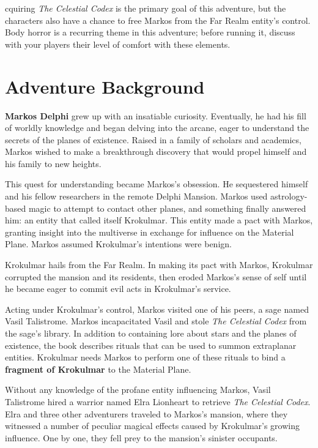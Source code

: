 \documentclass[10pt,a4paper,twoside,bg=print,twocolumn,openany,nodeprecatedcode]{dndbook}
\begin{document}
cquiring \textit{The Celestial Codex} is the primary goal of this adventure, but the characters also have a chance to free Markos from the Far Realm entity's control. Body horror is a recurring theme in this adventure; before running it, discuss with your players their level of comfort with these elements.


\section{Adventure Background}
\textbf{Markos Delphi} grew up with an insatiable curiosity. Eventually, he had his fill of worldly knowledge and began delving into the arcane, eager to understand the secrets of the planes of existence. Raised in a family of scholars and academics, Markos wished to make a breakthrough discovery that would propel himself and his family to new heights.

This quest for understanding became Markos's obsession. He sequestered himself and his fellow researchers in the remote Delphi Mansion. Markos used astrology-based magic to attempt to contact other planes, and something finally answered him: an entity that called itself Krokulmar. This entity made a pact with Markos, granting insight into the multiverse in exchange for influence on the Material Plane. Markos assumed Krokulmar's intentions were benign.

Krokulmar hails from the Far Realm. In making its pact with Markos, Krokulmar corrupted the mansion and its residents, then eroded Markos's sense of self until he became eager to commit evil acts in Krokulmar's service.

Acting under Krokulmar's control, Markos visited one of his peers, a sage named Vasil Talistrome. Markos incapacitated Vasil and stole \textit{The Celestial Codex} from the sage's library. In addition to containing lore about stars and the planes of existence, the book describes rituals that can be used to summon extraplanar entities. Krokulmar needs Markos to perform one of these rituals to bind a \textbf{fragment of Krokulmar} to the Material Plane.

Without any knowledge of the profane entity influencing Markos, Vasil Talistrome hired a warrior named Elra Lionheart to retrieve \textit{The Celestial Codex}. Elra and three other adventurers traveled to Markos's mansion, where they witnessed a number of peculiar magical effects caused by Krokulmar's growing influence. One by one, they fell prey to the mansion's sinister occupants.
\end{document}
